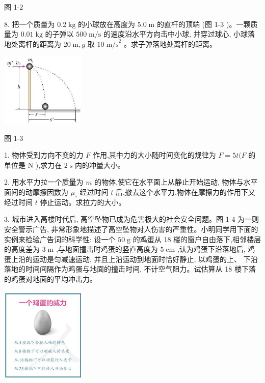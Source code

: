 \documentclass[10pt]{article}
\begin{document}
图 1-2

8. 把一个质量为 \({0.2}\mathrm{\;{kg}}\) 的小球放在高度为 \({5.0}\mathrm{\;m}\) 的直杆的顶端 (图 1-3 )。一颗质量为 \({0.01}\mathrm{\;{kg}}\) 的子弹以 \({500}\mathrm{\;m}/\mathrm{s}\) 的速度沿水平方向击中小球, 并穿过球心, 小球落地处离杆的距离为 \({20}\mathrm{\;m},g\) 取 \({10}{\mathrm{\;m/s}}^{2}\) 。求子弹落地处离杆的距离。

\begin{center}
\includegraphics[max width=0.3\textwidth]{images/01910e4c-ebb8-7d2c-8f2f-2375bc1d2d12_34_996541.jpg}
\end{center}

图 1-3

1. 物体受到方向不变的力 \(F\) 作用,其中力的大小随时间变化的规律为 \(F = {5t}(F\) 的单位是 \(\mathrm{N}\) ),求力在 \(2\mathrm{\;s}\) 内的冲量大小。

2. 用水平力拉一个质量为 \(m\) 的物体,使它在水平面上从静止开始运动, 物体与水平面间的动摩擦因数为 \({\mu }_{ \circ }\) 经过时间 \(t\) 后,撤去这个水平力,物体在摩擦力的作用下又经过时间 \(t\) 停止运动。求拉力的大小。

3. 城市进入高楼时代后, 高空坠物已成为危害极大的社会安全问题。图 1-4 为一则安全警示广告, 非常形象地描述了高空坠物对人伤害的严重性。小明同学用下面的实例来检验广告词的科学性: 设一个 \({50}\mathrm{\;g}\) 的鸡蛋从 18 楼的窗户自由落下,相邻楼层的高度差为 \(3\mathrm{\;m}\) ,与地面撞击时鸡蛋的竖直高度为 \(5\mathrm{\;{cm}}\) ,认为鸡蛋下沿落地后, 鸡蛋上沿的运动是匀减速运动, 并且上沿运动到地面时恰好静止, 以鸡蛋的上、 下沿落地的时间间隔作为鸡蛋与地面的撞击时间, 不计空气阻力。试估算从 18 楼下落的鸡蛋对地面的平均冲击力。

\begin{center}
\includegraphics[max width=0.3\textwidth]{images/01910e4c-ebb8-7d2c-8f2f-2375bc1d2d12_35_392532.jpg}
\end{center}
\end{document}
